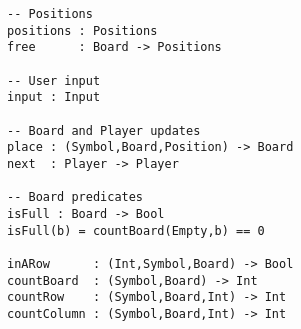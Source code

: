 \documentclass[11pt]{article}
\makeatletter
\newcommand{\prodName}[1]{&(\emph{#1})\\}
\newcommand{\nt}[1]{\textit{#1}}
\newcommand{\prog}[1]{\texttt{#1}}
\newcommand{\IS}{&::=&}
\newcommand{\syntax}[2]{
  \needspace{3\baselineskip}
  \bigskip\par\noindent\textbf{#1}\par\smallskip%
  $\begin{array}{rcl@{\qquad}l}#2\end{array}$%
  \par\bigskip\noindent\ignorespaces
}
\newcommand{\lp}{\prog{(}}
\newcommand{\rp}{\prog{)}}
\newcommand{\paren}[1]{\lp#1\rp}
\makeatother
\begin{document}
\begin{verbatim}
-- Positions
positions : Positions
free      : Board -> Positions

-- User input
input : Input

-- Board and Player updates
place : (Symbol,Board,Position) -> Board
next  : Player -> Player

-- Board predicates
isFull : Board -> Bool
isFull(b) = countBoard(Empty,b) == 0

inARow      : (Int,Symbol,Board) -> Bool
countBoard  : (Symbol,Board) -> Int
countRow    : (Symbol,Board,Int) -> Int
countColumn : (Symbol,Board,Int) -> Int
\end{verbatim}



\end{document}
